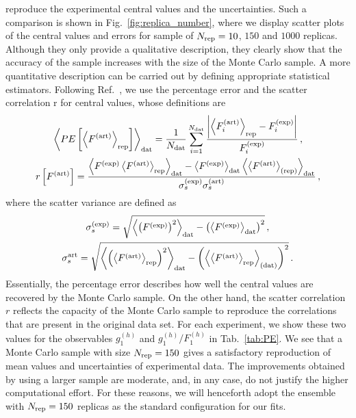 reproduce the experimental central values and the uncertainties. Such a comparison is shown in Fig.~\ref{fig:replica_number}, where we display scatter plots of the central values and errors for sample of $N_{\textrm{rep}} = 10$, $150$ and $1000$ replicas. Although they only provide a qualitative description, they clearly show that the accuracy of the sample increases with the size of the Monte Carlo sample. A more quantitative description can be carried out by defining appropriate statistical estimators. Following Ref.~\cite{DelDebbio:2004xtd}, we use the percentage error and the scatter correlation r for central values, whose definitions are
%
\begin{gather}
  \left< PE \left[ \left< F^{(\textrm{art})} \right>_{\textrm{rep}} \right] \right>_{\textrm{dat}} = \frac{1}{N_{\textrm{dat}}} \sum_{i=1}^{N_{\textrm{dat}}} \frac{\abs{\left< F_i^{\textrm{(art)}} \right>_{\textrm{rep}} - F_{i}^{\textrm{(exp)}}}}{F_i^{\textrm{(exp)}}}\,, \\
  r \left[ F^{\textrm{(art)}} \right] = \frac{\left< F^{\textrm{(exp)}} \left< F^{\textrm{(art)}} \right>_{\textrm{rep}} \right>_{\textrm{dat}} - \left< F^{\textrm{(exp)}} \right>_{\textrm{dat}} \left<  \left< F^{\textrm{(art)}} \right>_{\textrm{(rep)}}\right>_{\textrm{dat}} }{\sigma_s^{\textrm{(exp)}} \sigma_s^{\textrm{(art)}} }\,,
\end{gather}
where the scatter variance are defined as
\begin{gather}
  \sigma^{\textrm{(exp)}}_s = \sqrt{\left< \left( F^{\textrm{(exp)}} \right)^2 \right>_{\textrm{dat}} - \left( \left< F^{\textrm{(exp)}} \right>_{\textrm{dat}} \right)^2} \,,\\
  \sigma^{\textrm{art}}_s = \sqrt{\left< \left( \left<F^{\textrm{(art)}}\right>_{\textrm{rep}} \right)^2 \right>_{\textrm{dat}} - \left( \left< \left<F^{\textrm{(art)}}\right>_{\textrm{rep}} \right>_{\textrm{(dat)}} \right)^2} \,.
\end{gather}
Essentially, the percentage error describes how well the central values are recovered by the Monte Carlo sample. On the other hand, the scatter correlation $r$ reflects the capacity of the Monte Carlo sample to reproduce the correlations that are present in the original data set. For each experiment, we show these two values for the observables $g_1^{(h)}$ and $g_1^{(h)}/F_1^{(h)}$ in Tab.~\ref{tab:PE}. We see that a Monte Carlo sample with size $N_{\textrm{rep}} = 150$ gives a satisfactory reproduction of mean values and uncertainties of experimental data. The improvements obtained by using a larger sample are moderate, and, in any case, do not justify the higher computational effort. For these reasons, we will henceforth adopt the ensemble with $N_{\textrm{rep}} = 150$ replicas as the standard configuration for our fits.


